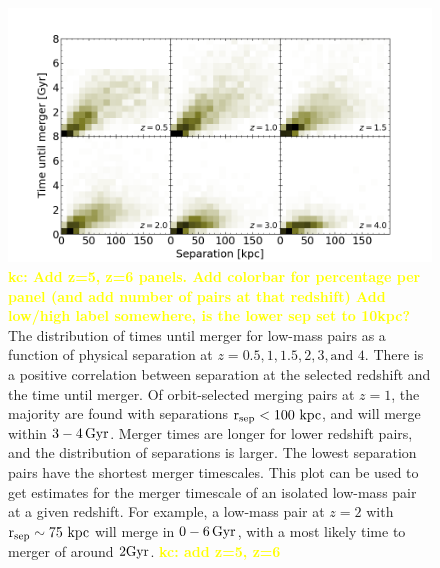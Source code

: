 \documentclass[twocolumn,linenumbers]{aastex631}
\newcommand{\kc}[1]{\textcolor{yellow}{\textbf{kc: #1}} }
\newcommand{\rsep}{\ensuremath{\rm r_{sep}}}
\begin{document}
\begin{figure}[htb]
    \begin{center}
    \includegraphics[width=\textwidth]{plots/bet-on-it/3_Timevsseplow-2d.png}
    \caption{\kc{Add z=5, z=6 panels. Add colorbar for percentage per panel (and add number of pairs at that redshift) Add low/high label somewhere, is the lower sep set to 10kpc?} The distribution of times until merger for low-mass pairs as a function of physical separation at $z=0.5,1,1.5,2,3,\mbox{and }4$. 
    There is a positive correlation between separation at the selected redshift and the time until merger. 
    Of orbit-selected merging pairs at $z=1$, the majority are found with separations $\rsep<100\,\kpc$, and will merge within $3-4\, \mathrm{Gyr}$. 
    Merger times are longer for lower redshift pairs, and the distribution of separations is larger.
    The lowest separation pairs have the shortest merger timescales.
    This plot can be used to get estimates for the merger timescale of an isolated low-mass pair at a given redshift. For example, a low-mass pair at $z=2$ with $\rsep\sim 75\,\kpc$ will merge in $0-6\,\mathrm{Gyr}$, with a most likely time to merger of around $2\mathrm{Gyr}$.
    \kc{add z=5, z=6}
    }
    \label{fig:timevssep-low}
    \end{center}
\end{figure}
\end{document}
